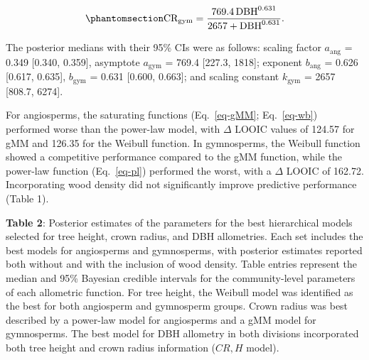 \documentclass[
  12pt,
  letterpaper,
  DIV=11,
  numbers=noendperiod]{scrartcl}
\begin{document}
\begin{equation}\phantomsection\label{eq-cr_gym}{
\mathrm{CR_{gym}} = \frac{\mathrm{769.4}
\, \mathrm{DBH}^{\mathrm{0.631}}}
{\mathrm{2657}
+ \mathrm{DBH}^{\mathrm{0.631}}}.
}\end{equation}

The posterior medians with their 95\% CIs were as follows: scaling
factor \(a_{\text{ang}}\) = 0.349 {[}0.340, 0.359{]}, asymptote
\(a_{\text{gym}}\) = 769.4 {[}227.3, 1818{]}; exponent
\(b_{\text{ang}}\) = 0.626 {[}0.617, 0.635{]}, \(b_{\text{gym}}\) =
0.631 {[}0.600, 0.663{]}; and scaling constant \(k_{\text{gym}}\) = 2657
{[}808.7, 6274{]}.

For angiosperms, the saturating functions (Eq.~\ref{eq-gMM};
Eq.~\ref{eq-wb}) performed worse than the power-law model, with
\(\Delta\) LOOIC values of 124.57 for gMM and 126.35 for the Weibull
function. In gymnosperms, the Weibull function showed a competitive
performance compared to the gMM function, while the power-law function
(Eq.~\ref{eq-pl}) performed the worst, with a \(\Delta\) LOOIC of
162.72. Incorporating wood density did not significantly improve
predictive performance (Table 1).

\textbf{Table 2}: Posterior estimates of the parameters for the best
hierarchical models selected for tree height, crown radius, and DBH
allometries. Each set includes the best models for angiosperms and
gymnosperms, with posterior estimates reported both without and with the
inclusion of wood density. Table entries represent the median and 95\%
Bayesian credible intervals for the community-level parameters of each
allometric function. For tree height, the Weibull model was identified
as the best for both angiosperm and gymnosperm groups. Crown radius was
best described by a power-law model for angiosperms and a gMM model for
gymnosperms. The best model for DBH allometry in both divisions
incorporated both tree height and crown radius information (\(CR,H\)
model).

\newpage

\begingroup\fontsize{10}{12}\selectfont
\end{document}
